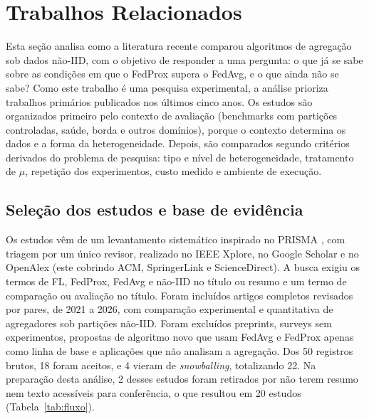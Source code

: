 \section{Trabalhos Relacionados}
\label{trabalhosrelacionados}

Esta seção analisa como a literatura recente comparou algoritmos de agregação sob dados não-IID, com o objetivo de responder a uma pergunta: o que já se sabe sobre as condições em que o FedProx supera o FedAvg, e o que ainda não se sabe? Como este trabalho é uma pesquisa experimental, a análise prioriza trabalhos primários publicados nos últimos cinco anos. Os estudos são organizados primeiro pelo contexto de avaliação (benchmarks com partições controladas, saúde, borda e outros domínios), porque o contexto determina os dados e a forma da heterogeneidade. Depois, são comparados segundo critérios derivados do problema de pesquisa: tipo e nível de heterogeneidade, tratamento de $\mu$, repetição dos experimentos, custo medido e ambiente de execução.

\subsection{Seleção dos estudos e base de evidência}

Os estudos vêm de um levantamento sistemático inspirado no PRISMA \citep{page2021prisma}, com triagem por um único revisor, realizado no IEEE Xplore, no Google Scholar e no OpenAlex (este cobrindo ACM, SpringerLink e ScienceDirect). A busca exigiu os termos de FL, FedProx, FedAvg e não-IID no título ou resumo e um termo de comparação ou avaliação no título. Foram incluídos artigos completos revisados por pares, de 2021 a 2026, com comparação experimental e quantitativa de agregadores sob partições não-IID. Foram excluídos preprints, surveys sem experimentos, propostas de algoritmo novo que usam FedAvg e FedProx apenas como linha de base e aplicações que não analisam a agregação. Dos 50 registros brutos, 18 foram aceitos, e 4 vieram de \textit{snowballing}, totalizando 22. Na preparação desta análise, 2 desses estudos foram retirados por não terem resumo nem texto acessíveis para conferência, o que resultou em 20 estudos (Tabela~\ref{tab:fluxo}).

